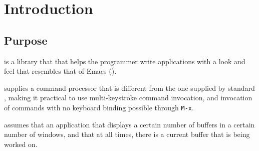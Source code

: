 \chapter{Introduction}
%

\section{Purpose}

\sysname{} is a library that that helps the programmer write
applications with a look and feel that resembles that of Emacs
(\cite{GNUEmacsLispReferenceManual,CraftOfTextEditiing,Finseth:1980:TPTa}).

\sysname{} supplies a command processor that is different from the one
supplied by standard \clim{}, making it practical to use multi-keystroke
command invocation, and invocation of commands with no keyboard
binding possible through \texttt{M-x}.

\sysname{} assumes that an application that displays a certain number
of buffers in a certain number of windows, and that at all times,
there is a current buffer that is being worked on.
